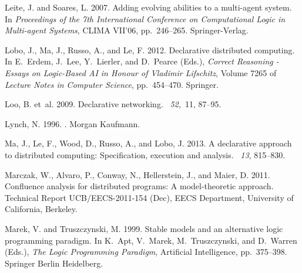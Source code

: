 \documentclass{tlp}
\begin{document}
\begin{thebibliography}{}
{\sc Leite, J.} {\sc and} {\sc Soares, L.} 2007.
\newblock Adding evolving abilities to a multi-agent system.
\newblock In {\em Proceedings of the 7th International Conference on
  Computational Logic in Multi-agent Systems}, CLIMA VII'06, pp.\  246--265.
  Springer-Verlag.

{\sc Lobo, J.}, {\sc Ma, J.}, {\sc Russo, A.}, {\sc and} {\sc Le, F.} 2012.
\newblock Declarative distributed computing.
\newblock In {\sc E.~Erdem}, {\sc J.~Lee}, {\sc Y.~Lierler}, {\sc and} {\sc
  D.~Pearce} (Eds.), {\em Correct Reasoning - Essays on Logic-Based AI in
  Honour of Vladimir Lifschitz}, Volume 7265 of {\em Lecture Notes in Computer
  Science}, pp.\  454--470. Springer.

{\sc Loo, B.} {\sc et~al.} 2009.
\newblock Declarative networking.
~{\em 52,\/}~11, 87--95.

{\sc Lynch, N.} 1996.
.
\newblock Morgan Kaufmann.

{\sc Ma, J.}, {\sc Le, F.}, {\sc Wood, D.}, {\sc Russo, A.}, {\sc and} {\sc
  Lobo, J.} 2013.
\newblock A declarative approach to distributed computing: Specification,
  execution and analysis.
~{\em 13}, 815--830.

{\sc Marczak, W.}, {\sc Alvaro, P.}, {\sc Conway, N.}, {\sc Hellerstein, J.},
  {\sc and} {\sc Maier, D.} 2011.
\newblock Confluence analysis for distributed programs: A model-theoretic
  approach.
\newblock Technical Report UCB/EECS-2011-154 (Dec), EECS Department, University
  of California, Berkeley.

{\sc Marek, V.} {\sc and} {\sc Truszczynski, M.} 1999.
\newblock Stable models and an alternative logic programming paradigm.
\newblock In {\sc K.~Apt}, {\sc V.~Marek}, {\sc M.~Truszczynski}, {\sc and}
  {\sc D.~Warren} (Eds.), {\em The Logic Programming Paradigm}, Artificial
  Intelligence, pp.\  375--398. Springer Berlin Heidelberg.


\end{thebibliography}
\end{document}

